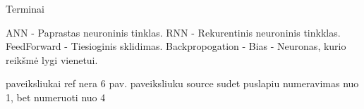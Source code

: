 Terminai

ANN - Paprastas neuroninis tinklas.
RNN - Rekurentinis neuroninis tinkklas.
FeedForward - Tiesioginis sklidimas.
Backpropogation -
Bias - Neuronas, kurio reikšmė lygi vienetui.




paveiksliukai ref nera 6 pav.
paveiksliuku source sudet
puslapiu numeravimas nuo 1, bet numeruoti nuo 4


















%
